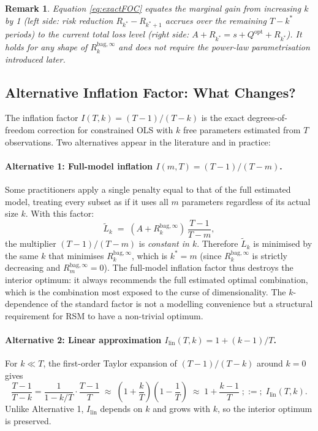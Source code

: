 \documentclass[12pt,a4paper]{article}
\newtheorem{remark}{Remark}
\theoremstyle{definition}
\newcommand{\Qopt}{Q^{\mathrm{opt}}}
\newcommand{\Rk}{R_k^{\mathrm{bag},\infty}}
\begin{document}
\begin{remark}
Equation \eqref{eq:exactFOC} equates the marginal gain from increasing $k$
by 1 (left side: risk reduction $R_{k^*}-R_{k^*+1}$ accrues over the
remaining $T-k^*$ periods) to the current total loss level
(right side: $A+R_{k^*}=s+\Qopt+R_{k^*}$).  It holds for any shape of
$\Rk$ and does not require the power-law parametrisation introduced later.
\end{remark}

\subsection{Alternative Inflation Factor: What Changes?}
\label{sec:altinflation}

The inflation factor $I(T,k)=(T-1)/(T-k)$ is the exact degrees-of-freedom
correction for constrained OLS with $k$ free parameters estimated from $T$
observations.  Two alternatives appear in the literature and in practice:

\paragraph{Alternative 1: Full-model inflation $I(m,T)=(T-1)/(T-m)$.}
Some practitioners apply a single penalty equal to that of the full estimated
model, treating every subset as if it uses all $m$ parameters regardless of
its actual size $k$.  With this factor:
\begin{equation}
  \tilde L_k \;=\; (A+\Rk)\,\frac{T-1}{T-m},
\end{equation}
the multiplier $(T-1)/(T-m)$ is \emph{constant in $k$}.  Therefore
$\tilde L_k$ is minimised by the same $k$ that minimises $\Rk$, which is
$k^*=m$ (since $\Rk$ is strictly decreasing and $R_m^{\mathrm{bag},\infty}=0$).
The full-model inflation factor thus destroys the interior optimum: it always
recommends the full estimated optimal combination, which is the combination
most exposed to the curse of dimensionality.  The $k$-dependence of the
standard factor is not a modelling convenience but a structural requirement for
RSM to have a non-trivial optimum.

\paragraph{Alternative 2: Linear approximation $I_{\mathrm{lin}}(T,k)=1+(k-1)/T$.}
For $k\ll T$, the first-order Taylor expansion of $(T-1)/(T-k)$ around $k=0$
gives
\begin{equation}\label{eq:Ilin}
  \frac{T-1}{T-k} = \frac{1}{1-k/T}\cdot\frac{T-1}{T}
  \;\approx\; \left(1+\frac{k}{T}\right)\left(1-\frac{1}{T}\right)
  \;\approx\; 1+\frac{k-1}{T}
  \;;:=;\; I_{\mathrm{lin}}(T,k).
\end{equation}
Unlike Alternative 1, $I_{\mathrm{lin}}$ depends on $k$ and grows with $k$,
so the interior optimum is preserved.
\end{document}
